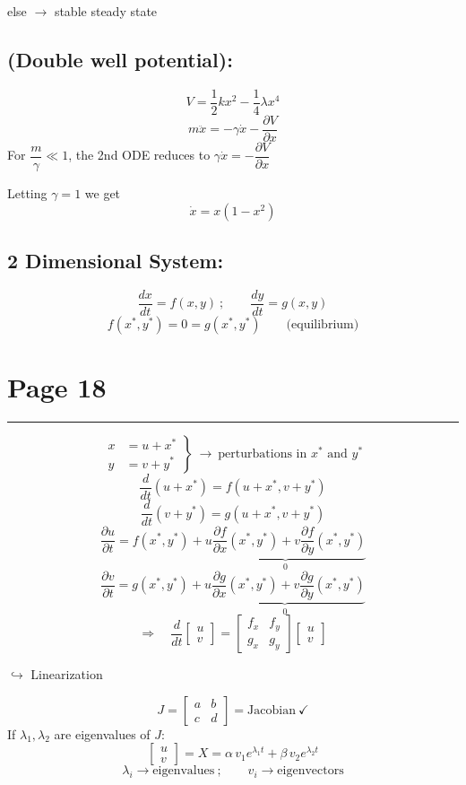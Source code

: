 \documentclass[11pt,a4paper]{article}
\newcommand{\pagehead}[1]{%
  \clearpage
  \section*{Page #1}
  \vspace{-0.6em}
  {\color{black!45}\rule{\linewidth}{0.5pt}}
  \vspace{0.4em}
}
\begin{document}
else $\to$ stable steady state

\subsection*{(Double well potential):}
\[
V=\frac12kx^2-\frac14\lambda x^4
\]
\[
m\ddot x=-\gamma\dot x-\frac{\partial V}{\partial x}
\]
For $\dfrac{m}{\gamma}\ll1$, the 2nd ODE reduces to
$\gamma\dot x=-\dfrac{\partial V}{\partial x}$

Letting $\gamma=1$ we get
\[
\dot x=x(1-x^2)
\]

\subsection*{2 Dimensional System:}
\[
\frac{dx}{dt}=f(x,y)\ ;\qquad \frac{dy}{dt}=g(x,y)
\]
\[
f(x^*,y^*)=0=g(x^*,y^*)\qquad\text{(equilibrium)}
\]

\pagehead{18}

\[
\left.\begin{aligned}
x&=u+x^*\\
y&=v+y^*
\end{aligned}\right\}
\ \to\ \text{perturbations in }x^*\text{ and }y^*
\]
\[
\frac{d}{dt}(u+x^*)=f(u+x^*,v+y^*)
\]
\[
\frac{d}{dt}(v+y^*)=g(u+x^*,v+y^*)
\]
\[
\frac{\partial u}{\partial t}
=f(x^*,y^*)+\underbrace{u\frac{\partial f}{\partial x}(x^*,y^*)
+v\frac{\partial f}{\partial y}(x^*,y^*)}_{0}
\]
\[
\frac{\partial v}{\partial t}
=g(x^*,y^*)+\underbrace{u\frac{\partial g}{\partial x}(x^*,y^*)
+v\frac{\partial g}{\partial y}(x^*,y^*)}_{0}
\]
\[
\Rightarrow\quad \frac{d}{dt}
\begin{bmatrix}u\\v\end{bmatrix}
=
\begin{bmatrix}f_x&f_y\\g_x&g_y\end{bmatrix}
\begin{bmatrix}u\\v\end{bmatrix}
\]
\begin{center}
\small$\hookrightarrow$ Linearization
\end{center}
\[
J=\begin{bmatrix}a&b\\c&d\end{bmatrix}=\text{Jacobian}\ \checkmark
\]
If $\lambda_1,\lambda_2$ are eigenvalues of $J$:
\[
\begin{bmatrix}u\\v\end{bmatrix}=X
=\alpha\,v_1e^{\lambda_1t}+\beta\,v_2e^{\lambda_2t}
\]
\[
\lambda_i\to\text{eigenvalues}\ ;\qquad v_i\to\text{eigenvectors}
\]
\end{document}
